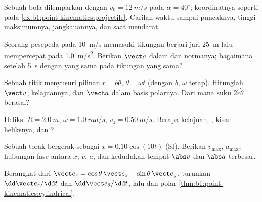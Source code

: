 \begin{exercise}[$\star$]\label{exo:b1:point-kinematics:4}
Sebuah bola dilemparkan dengan $v_0 = \qty{12}{m/s}$ pada
$\alpha = 40^\circ$; koordinatnya seperti pada
\cref{ex:b1:point-kinematics:projectile}. Carilah waktu sampai
puncaknya, tinggi maksimumnya, jangkauannya, dan  saat mendarat.
\end{exercise}

\begin{exercise}[$\star\star$]\label{exo:b1:point-kinematics:5}
Seorang pesepeda pada \qty{10}{m/s} memasuki tikungan berjari-jari
\qty{25}{m} lalu mempercepat pada \qty{1.0}{m/s^2}. Berikan $\vect a$
dalam  dan normanya; bagaimana setelah \qty{5}{s} dengan
 yang sama pada tikungan yang sama?
\end{exercise}

\begin{exercise}[$\star\star$]\label{exo:b1:point-kinematics:6}
Sebuah titik menyusuri pilinan $r = b\theta$, $\theta = \omega t$
(dengan $b$, $\omega$ tetap). Hitunglah $\vect v$, kelajuannya, dan
$\vect a$ dalam basis polarnya. Dari mana suku $2\dot r\dot\theta$ berasal?
\end{exercise}

\begin{exercise}[$\star\star$]\label{exo:b1:point-kinematics:7}
Heliks: $R = \qty{2.0}{m}$, $\omega = \qty{1.0}{rad/s}$, $v_z = \qty{0.50}{m/s}$.
Berapa kelajuan, , kisar heliksnya, dan ?
\end{exercise}

\begin{exercise}[$\star\star$]\label{exo:b1:point-kinematics:8}
Sebuah torak bergerak sebagai $x = 0.10\cos(10t)$ (SI). Berikan
$v_{\max}$, $a_{\max}$, hubungan fase antara $x$, $v$, $a$, dan
kedudukan tempat $\abs v$ dan $\abs a$ terbesar.
\end{exercise}

\begin{exercise}[$\star\star$]\label{exo:b1:point-kinematics:9}
Berangkat dari $\vect e_r = \cos\theta\,\vect e_x + \sin\theta\,\vect e_y$,
turunkan $\dd\vect e_r/\dd t$ dan $\dd\vect e_\theta/\dd t$, lalu
 dan  polar \cref{thm:b1:point-kinematics:cylindrical}.
\end{exercise}

